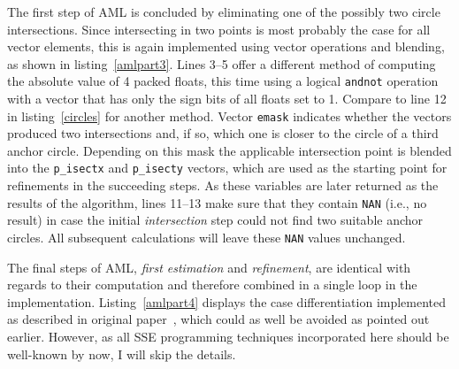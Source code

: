 
The first step of AML is concluded by eliminating one of the possibly two circle intersections. Since intersecting in two points is most probably the case for all vector elements, this is again implemented using vector operations and blending, as shown in listing~\ref{amlpart3}. Lines 3--5 offer a different method of computing the absolute value of 4 packed floats, this time using a logical \texttt{andnot} operation with a vector that has only the sign bits of all floats set to 1. Compare to line 12 in listing~\ref{circles} for another method. Vector \texttt{emask} indicates whether the vectors produced two intersections and, if so, which one is closer to the circle of a third anchor circle. Depending on this mask the applicable intersection point is blended into the \texttt{p\_isectx} and \texttt{p\_isecty} vectors, which are used as the starting point for refinements in the succeeding steps. As these variables are later returned as the results of the algorithm, lines 11--13 make sure that they contain \texttt{NAN} (i.e., no result) in case the initial \emph{intersection} step could not find two suitable anchor circles. All subsequent calculations will leave these \texttt{NAN} values unchanged.


The final steps of AML, \emph{first estimation} and \emph{refinement}, are identical with regards to their computation and therefore combined in a single loop in the implementation. Listing~\ref{amlpart4} displays the case differentiation implemented as described in original paper~\cite[p. 264]{kuruoglu2009aml}, which could as well be avoided as pointed out earlier. However, as all SSE programming techniques incorporated here should be well-known by now, I will skip the details.


